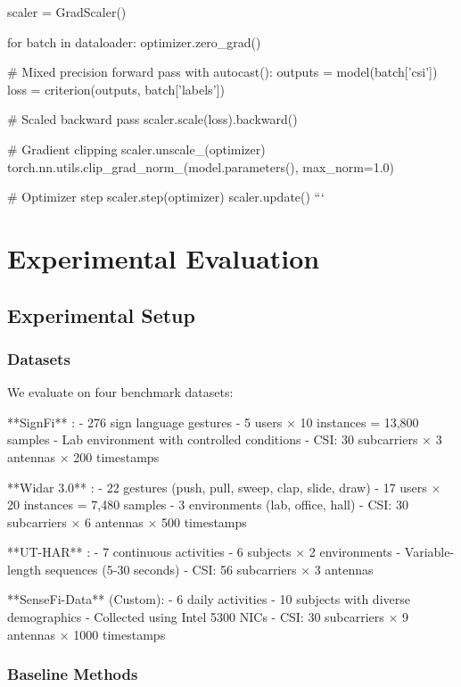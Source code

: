 \documentclass[10pt,journal,compsoc]{IEEEtran}
\begin{document}
scaler = GradScaler()

for batch in dataloader:
    optimizer.zero_grad()
    
    # Mixed precision forward pass
    with autocast():
        outputs = model(batch['csi'])
        loss = criterion(outputs, batch['labels'])
    
    # Scaled backward pass
    scaler.scale(loss).backward()
    
    # Gradient clipping
    scaler.unscale_(optimizer)
    torch.nn.utils.clip_grad_norm_(model.parameters(), max_norm=1.0)
    
    # Optimizer step
    scaler.step(optimizer)
    scaler.update()
```

\section{Experimental Evaluation}
\label{sec:experiments}

\subsection{Experimental Setup}

\subsubsection{Datasets}

We evaluate on four benchmark datasets:

**SignFi** \cite{signfi2018}:
- 276 sign language gestures
- 5 users × 10 instances = 13,800 samples
- Lab environment with controlled conditions
- CSI: 30 subcarriers × 3 antennas × 200 timestamps

**Widar 3.0** \cite{widar3}:
- 22 gestures (push, pull, sweep, clap, slide, draw)
- 17 users × 20 instances = 7,480 samples
- 3 environments (lab, office, hall)
- CSI: 30 subcarriers × 6 antennas × 500 timestamps

**UT-HAR** \cite{uthar2019}:
- 7 continuous activities
- 6 subjects × 2 environments
- Variable-length sequences (5-30 seconds)
- CSI: 56 subcarriers × 3 antennas

**SenseFi-Data** (Custom):
- 6 daily activities
- 10 subjects with diverse demographics
- Collected using Intel 5300 NICs
- CSI: 30 subcarriers × 9 antennas × 1000 timestamps

\subsubsection{Baseline Methods}
\end{document}
